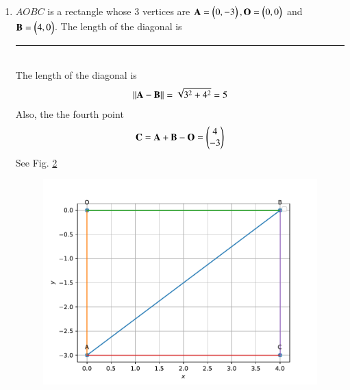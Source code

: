 \documentclass[journal,12pt,twocolumn]{IEEEtran}
\renewcommand\thesection{\arabic{section}}
\begin{document}
\begin{enumerate}[label=\thesection.\arabic*.,ref=\thesection.\theenumi]
\begin{figure}
	  \caption{}
	  \label{fig:matrix-10-5.pdf}
	  \end{figure}
  \item $AOBC$ is a rectangle whose 3 vertices are $\mathbf{A} = \begin{pmatrix}0,-3\end{pmatrix}, \mathbf{O} = \begin{pmatrix}0,0\end{pmatrix}$ and $\mathbf{B} = \begin{pmatrix}4,0\end{pmatrix}$. The length of the diagonal is \rule{1.5cm}{0.15mm}\\
\solution
The length of the diagonal is  
  \begin{align}
	  \left\lVert\mathbf{A}-\mathbf{B}\right\rVert = \sqrt{3^2+4^2} = 5
  \end{align}
  Also, the the fourth point 
  \begin{align}
	\mathbf{C} = \mathbf{A}+ \mathbf{B}-\mathbf{O} = \begin{pmatrix}4 \\ -3\end{pmatrix}
  \end{align}
    See Fig. 
	  \ref{fig:matrix-10-6.pdf}
  \begin{figure}
	  \centering 
	  \includegraphics[width=\columnwidth]{figs/matrix-10-6.pdf}
	  \caption{}
	  \label{fig:matrix-10-6.pdf}
	  \end{figure}
    


\end{enumerate}
\end{document}
